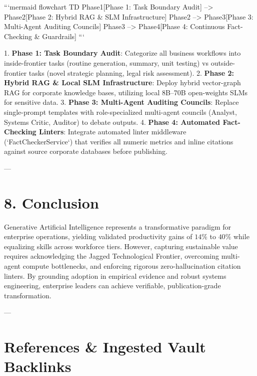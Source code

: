 \documentclass[10pt,journal,compsoc,twocolumn]{IEEEtran}
\begin{document}
```mermaid
flowchart TD
    Phase1[Phase 1: Task Boundary Audit] --> Phase2[Phase 2: Hybrid RAG & SLM Infrastructure]
    Phase2 --> Phase3[Phase 3: Multi-Agent Auditing Councils]
    Phase3 --> Phase4[Phase 4: Continuous Fact-Checking & Guardrails]
```

1. \textbf{Phase 1: Task Boundary Audit}: Categorize all business workflows into inside-frontier tasks (routine generation, summary, unit testing) vs outside-frontier tasks (novel strategic planning, legal risk assessment).
2. \textbf{Phase 2: Hybrid RAG & Local SLM Infrastructure}: Deploy hybrid vector-graph RAG for corporate knowledge bases, utilizing local 8B–70B open-weights SLMs for sensitive data.
3. \textbf{Phase 3: Multi-Agent Auditing Councils}: Replace single-prompt templates with role-specialized multi-agent councils (Analyst, Systems Critic, Auditor) to debate outputs.
4. \textbf{Phase 4: Automated Fact-Checking Linters}: Integrate automated linter middleware (`FactCheckerService`) that verifies all numeric metrics and inline citations against source corporate databases before publishing.

---

\section{8. Conclusion}

Generative Artificial Intelligence represents a transformative paradigm for enterprise operations, yielding validated productivity gains of $14\%$ to $40\%$ while equalizing skills across workforce tiers. However, capturing sustainable value requires acknowledging the Jagged Technological Frontier, overcoming multi-agent compute bottlenecks, and enforcing rigorous zero-hallucination citation linters. By grounding adoption in empirical evidence and robust systems engineering, enterprise leaders can achieve verifiable, publication-grade transformation.

---

\section{References & Ingested Vault Backlinks}
\end{document}
